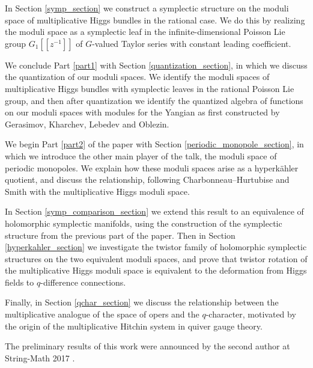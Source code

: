 \documentclass[11pt, oneside, reqno]{amsart}
\theoremstyle{definition} \newtheorem{definition}{Definition}[section]
\theoremstyle{definition} \newtheorem{remark}[definition]{Remark}
\theoremstyle{definition} \newtheorem{remarks}[definition]{Remarks}
\theoremstyle{definition} \newtheorem{question}[definition]{Question}
\theoremstyle{definition} \newtheorem*{note}{Note}
\theoremstyle{definition} \newtheorem{example}[definition]{Example}
\theoremstyle{definition} \newtheorem{examples}[definition]{Examples}
\begin{document}
In Section \ref{symp_section} we construct a symplectic structure on the moduli space of multiplicative Higgs bundles in the rational case.  We do this by realizing the moduli space as a symplectic leaf in the infinite-dimensional Poisson Lie group $G_1[[z^{-1}]]$ of $G$-valued Taylor series with constant leading coefficient.

We conclude Part \ref{part1} with Section \ref{quantization_section}, in which we discuss the quantization of our moduli spaces.  We identify the moduli spaces of multiplicative Higgs bundles with symplectic leaves in the rational Poisson Lie group, and then after quantization we identify the quantized algebra of functions on our moduli spaces with modules for the Yangian as first constructed by Gerasimov, Kharchev, Lebedev and Oblezin. 

We begin Part \ref{part2} of the paper with Section \ref{periodic_monopole_section}, in which we introduce the other main player of the talk, the moduli space of periodic monopoles.  We explain how these moduli spaces arise as a hyperk\"ahler quotient, and discuss the relationship, following Charbonneau--Hurtubise \cite{CharbonneauHurtubise} and Smith \cite{Smith} with the multiplicative Higgs moduli space.

In Section \ref{symp_comparison_section} we extend this result to an equivalence of holomorphic symplectic manifolds, using the construction of the symplectic structure from the previous part of the paper.  Then in Section \ref{hyperkahler_section} we investigate the twistor family of holomorphic symplectic structures on the two equivalent moduli spaces, and prove that twistor rotation of the multiplicative Higgs moduli space is equivalent to the deformation from Higgs fields to $q$-difference connections.

Finally, in Section \ref{qchar_section} we discuss the relationship between the multiplicative analogue of the space of opers and the $q$-character, motivated by the origin of the multiplicative Hitchin system in quiver gauge theory.

The preliminary results of this work were announced by the second author at String-Math 2017 \cite{PestunStringMath}.
\end{document}
